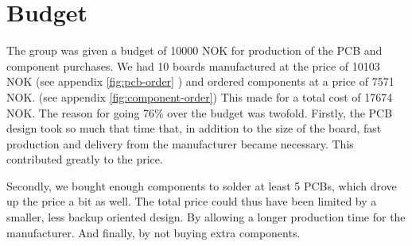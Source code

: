 \documentclass[../main/report.tex]{subfiles}
\begin{document}
\section{Budget}

The group was given a budget of 10000 NOK for production of the PCB and component purchases. 
We had 10 boards manufactured at the price of 10103 NOK (see appendix \ref{fig:pcb-order} ) and ordered components at a price of 7571 NOK. (see appendix \ref{fig:component-order}) 
This made for a total cost of 17674 NOK.
The reason for going 76\% over the budget was twofold. Firstly, the PCB design took so much that time that, in addition to the size of the board, fast production and delivery from the manufacturer became necessary. 
This contributed greatly to the price.

Secondly, we bought enough components to solder at least 5 PCBs, which drove up the price a bit as well.
The total price could thus have been limited by a smaller, less backup oriented design. 
By allowing a longer production time for the manufacturer.
And finally, by not buying extra components.
\end{document}
